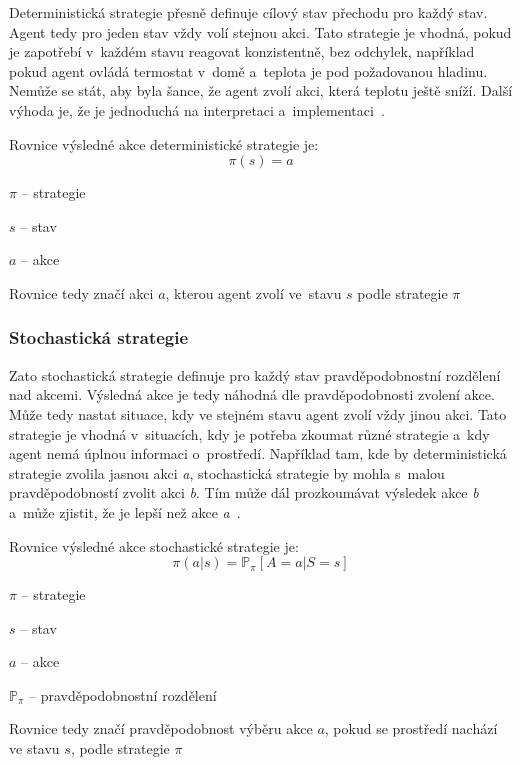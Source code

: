   Deterministická strategie přesně definuje cílový stav přechodu pro každý stav.
  Agent tedy pro jeden stav vždy volí stejnou akci.
  Tato strategie je vhodná, pokud je zapotřebí v~každém stavu reagovat konzistentně, bez odchylek, například pokud agent ovládá termostat v~domě a~teplota je pod požadovanou hladinu.
  Nemůže se stát, aby byla šance, že agent zvolí akci, která teplotu ještě sníží.
  Další výhoda je, že je jednoduchá na interpretaci a~implementaci~\cite{Policies}.

  Rovnice výsledné akce deterministické strategie je:
  \begin{equation}
    \pi(s) = a\label{eq:policy_deterministic}
  \end{equation}
\begin{myitemize}
  \item $\pi$ -- strategie
  \item $s$ -- stav
  \item $a$ -- akce
  \item Rovnice tedy značí akci $a$, kterou agent zvolí ve~stavu $s$ podle strategie $\pi$

\end{myitemize}

  \subsubsection*{Stochastická strategie}
  
  Zato stochastická strategie definuje pro každý stav pravděpodobnostní rozdělení nad akcemi.
  Výsledná akce je tedy náhodná dle pravděpodobnosti zvolení akce.
  Může tedy nastat situace, kdy ve stejném stavu agent zvolí vždy jinou akci.
  Tato strategie je vhodná v~situacích, kdy je potřeba zkoumat různé strategie a~kdy agent nemá úplnou informaci o~prostředí.
  Například tam, kde by deterministická strategie zvolila jasnou akci \textit{a}, stochastická strategie by mohla s~malou pravděpodobností zvolit akci \textit{b}.
  Tím může dál prozkoumávat výsledek akce \textit{b} a~může zjistit, že je lepší než akce \textit{a}~\cite{Policies}.

  Rovnice výsledné akce stochastické strategie je:
  \begin{equation}
    \pi(a \vert s) = \mathbb{P}_\pi [A=a \vert S=s]\label{eq:policy_stochastic}
  \end{equation}

  \begin{myitemize}
    \item $\pi$ -- strategie
    \item $s$ -- stav
    \item $a$ -- akce
    \item $\mathbb{P}_\pi$ -- pravděpodobnostní rozdělení
    \item Rovnice tedy značí pravděpodobnost výběru akce $a$, pokud se prostředí nachází ve stavu $s$, podle strategie $\pi$
  \end{myitemize}
  

